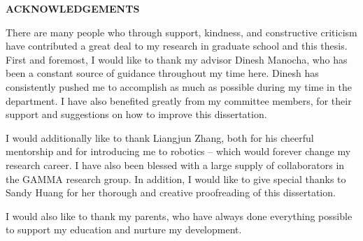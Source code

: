 \begin{center}
\vspace*{52pt}
{\Large \textbf{ACKNOWLEDGEMENTS}}
\end{center}

There are many people who through support, kindness, and constructive criticism have contributed a great deal to my research in graduate school and this thesis. First and foremost, I would like to thank my advisor Dinesh Manocha, who has been a constant source of guidance throughout my time here.  Dinesh has consistently pushed me to accomplish as much as possible during my time in the department. I have also benefited greatly from my committee members, for their support and suggestions on how to improve this dissertation.

I would additionally like to thank Liangjun Zhang, both for his cheerful mentorship and for introducing me to robotics -- which would forever change my research career. I have also been blessed with a large supply of collaborators in the GAMMA research group. In addition, I would like to give special thanks to Sandy Huang for her thorough and creative proofreading of this dissertation.

I would also like to thank my parents, who have always done everything possible to support my education and nurture my development.

